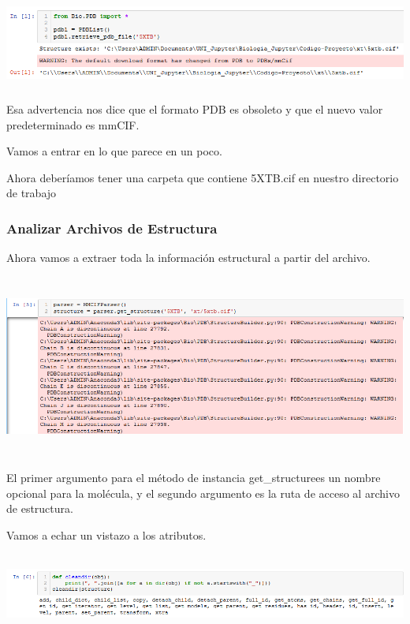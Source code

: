 \documentclass[a4paper]{article}
\begin{document}
\begin{center}
	\includegraphics[width=16cm,height=3cm]{PDB.png}
\end{center}

Esa advertencia nos dice que el formato PDB es obsoleto y que el nuevo valor predeterminado es mmCIF.

Vamos a entrar en lo que parece en un poco.

Ahora deberíamos tener una carpeta que contiene 5XTB.cif en nuestro directorio de trabajo

\subsubsection{Analizar Archivos de Estructura}

Ahora vamos a extraer toda la información estructural a partir del archivo.

\begin{center}
	\includegraphics[width=17cm,height=6cm]{parse.png}
\end{center}

El primer argumento para el método de instancia get\_structurees un nombre opcional para la molécula, y el segundo argumento es la ruta de acceso al archivo de estructura.

Vamos a echar un vistazo a los atributos.

\begin{center}
	\includegraphics[width=16cm,height=2.6cm]{cleandir.png}
\end{center}
\end{document}
